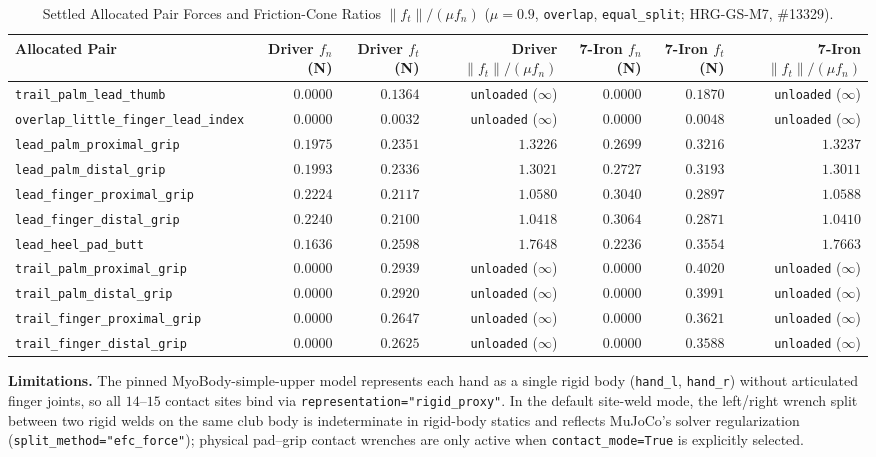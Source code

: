 \documentclass[11pt,a4paper]{article}
\begin{document}
\begin{table}[h!]
\centering
\caption{Settled Allocated Pair Forces and Friction-Cone Ratios $\|f_t\| / (\mu f_n)$ ($\mu = 0.9$, \texttt{overlap}, \texttt{equal\_split}; HRG-GS-M7, \#13329).}
\label{tab:hrg-gs-m7-friction-cone}
\small
\begin{tabular}{lrrrrrr}
\toprule
Allocated Pair & Driver $f_n$ (N) & Driver $f_t$ (N) & Driver $\|f_t\|/(\mu f_n)$ & 7-Iron $f_n$ (N) & 7-Iron $f_t$ (N) & 7-Iron $\|f_t\|/(\mu f_n)$ \\
\midrule
\texttt{trail\_palm\_lead\_thumb} & $0.0000$ & $0.1364$ & \texttt{unloaded} ($\infty$) & $0.0000$ & $0.1870$ & \texttt{unloaded} ($\infty$) \\
\texttt{overlap\_little\_finger\_lead\_index} & $0.0000$ & $0.0032$ & \texttt{unloaded} ($\infty$) & $0.0000$ & $0.0048$ & \texttt{unloaded} ($\infty$) \\
\texttt{lead\_palm\_proximal\_grip} & $0.1975$ & $0.2351$ & $1.3226$ & $0.2699$ & $0.3216$ & $1.3237$ \\
\texttt{lead\_palm\_distal\_grip} & $0.1993$ & $0.2336$ & $1.3021$ & $0.2727$ & $0.3193$ & $1.3011$ \\
\texttt{lead\_finger\_proximal\_grip} & $0.2224$ & $0.2117$ & $1.0580$ & $0.3040$ & $0.2897$ & $1.0588$ \\
\texttt{lead\_finger\_distal\_grip} & $0.2240$ & $0.2100$ & $1.0418$ & $0.3064$ & $0.2871$ & $1.0410$ \\
\texttt{lead\_heel\_pad\_butt} & $0.1636$ & $0.2598$ & $1.7648$ & $0.2236$ & $0.3554$ & $1.7663$ \\
\texttt{trail\_palm\_proximal\_grip} & $0.0000$ & $0.2939$ & \texttt{unloaded} ($\infty$) & $0.0000$ & $0.4020$ & \texttt{unloaded} ($\infty$) \\
\texttt{trail\_palm\_distal\_grip} & $0.0000$ & $0.2920$ & \texttt{unloaded} ($\infty$) & $0.0000$ & $0.3991$ & \texttt{unloaded} ($\infty$) \\
\texttt{trail\_finger\_proximal\_grip} & $0.0000$ & $0.2647$ & \texttt{unloaded} ($\infty$) & $0.0000$ & $0.3621$ & \texttt{unloaded} ($\infty$) \\
\texttt{trail\_finger\_distal\_grip} & $0.0000$ & $0.2625$ & \texttt{unloaded} ($\infty$) & $0.0000$ & $0.3588$ & \texttt{unloaded} ($\infty$) \\
\bottomrule
\end{tabular}
\end{table}

\textbf{Limitations.}
The pinned MyoBody-simple-upper model represents each hand as a single rigid body (\texttt{hand\_l}, \texttt{hand\_r}) without articulated finger joints, so all $14$--$15$ contact sites bind via \texttt{representation="rigid\_proxy"}. In the default site-weld mode, the left/right wrench split between two rigid welds on the same club body is indeterminate in rigid-body statics and reflects MuJoCo's solver regularization (\texttt{split\_method="efc\_force"}); physical pad--grip contact wrenches are only active when \texttt{contact\_mode=True} is explicitly selected.
\end{document}
